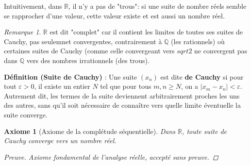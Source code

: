\documentclass{report} %
\theoremstyle{definition}  %
\theoremstyle{plain} %
\newtheorem{axiom}{Axiome}
\theoremstyle{remark} %
\newtheorem*{remark}{Remarque} %
\begin{document}
\noindent
Intuitivement, dans \(\mathbb{R}\), il n'y a pas de "trous": si une suite de nombre réels semble se rapprocher d'une valeur, 
cette valeur existe et est aussi un nombre réel.

\medskip
\begin{remark}
\(\mathbb{R}\) est dit "complet" car il contient les limites de toutes ses suites de Cauchy, 
pas seulemnet convergentes, 
contrairement à \(\mathbb{Q}\) (les rationnels) où certaines suites de Cauchy 
(comme celle convergeant vers \(sqrt{2}\) ne convergent pas dans \(\mathbb{Q}\) 
vers des nombres irrationnels (des trous).
\end{remark}

\medskip


\noindent
\textbf{Définition (Suite de Cauchy)} :
Une suite \((x_n)\) est dite \textbf{de Cauchy} si pour tout \(\varepsilon > 0\), il existe un entier \(N\) tel que pour tous \(m, n \geq N\), on a \(|x_m - x_n| < \varepsilon\).
Autrement dit, les termes de la suite deviennent arbitrairement proches les uns des autres,
sans qu'il soit nécessaire de connaître vers quelle limite éventuelle la suite converge.
\medskip

\begin{axiom}[Axiome de la complétude séquentielle]
Dans \(\mathbb{R}\), toute suite de Cauchy converge vers un nombre réel.
\medskip


\begin{proof}[Preuve]
Axiome fondamental de l'analyse réelle, accepté sans preuve.
\end{proof}

\medskip

\end{axiom}

\medskip
\end{document}
